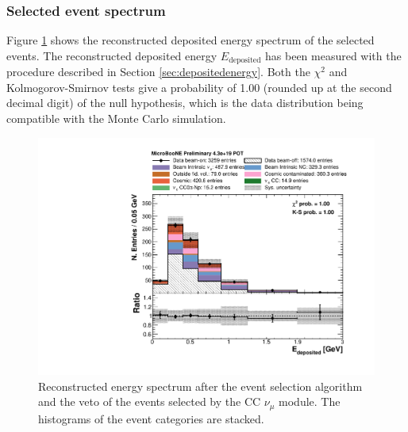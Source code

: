 \subsubsection{Selected event spectrum}
Figure \ref{fig:spectrum} shows the reconstructed deposited energy spectrum of the selected events. The reconstructed deposited energy $E_{\mathrm{deposited}}$ has been measured with the procedure described in Section \ref{sec:depositedenergy}. Both the $\chi^2$ and Kolmogorov-Smirnov \cite{massey1951kolmogorov} tests give a probability of 1.00 (rounded up at the second decimal digit) of the null hypothesis, which is the data distribution being compatible with the Monte Carlo simulation.

\begin{figure}[htbp]
\centering
  \includegraphics[width=0.65\linewidth]{figures/h_fixed_energy.pdf}
  \caption{Reconstructed energy spectrum after the event selection algorithm and the veto of the events selected by the CC $\nu_{\mu}$ module. The histograms of the event categories are stacked.}
  \label{fig:spectrum}
\end{figure}
